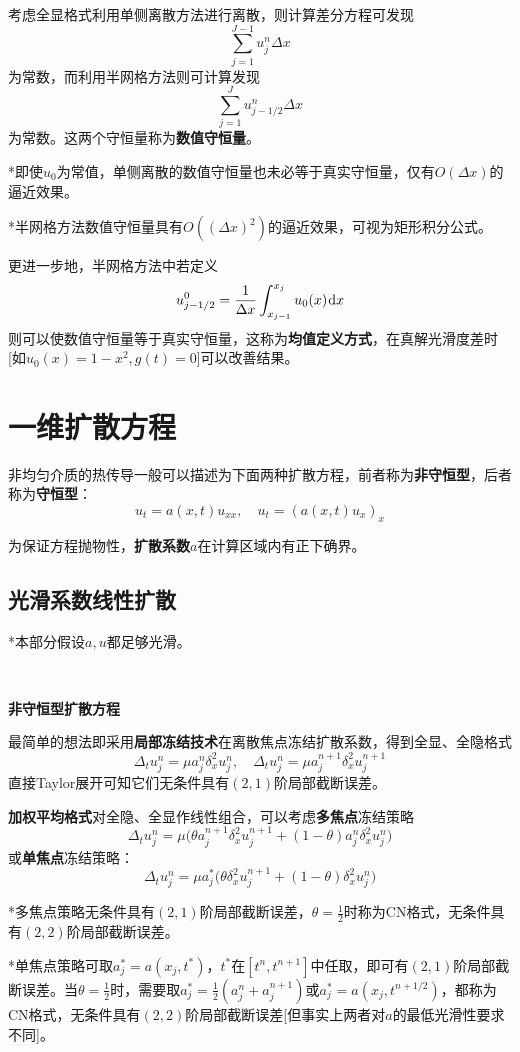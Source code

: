 \documentclass[a4paper,UTF8,fontset=windows]{ctexart}
\newcommand*{\dr}{\hspace{0.07em}\mathrm{d}}
\begin{document}
考虑全显格式利用单侧离散方法进行离散，则计算差分方程可发现
$$\sum_{j=1}^{J-1}u_j^n\Delta x$$
为常数，而利用半网格方法则可计算发现
$$\sum_{j=1}^Ju_{j-1/2}^n\Delta x$$
为常数。这两个守恒量称为\textbf{数值守恒量}。

*即使$u_0$为常值，单侧离散的数值守恒量也未必等于真实守恒量，仅有$O(\Delta x)$的逼近效果。

*半网格方法数值守恒量具有$O((\Delta x)^2)$的逼近效果，可视为矩形积分公式。

更进一步地，半网格方法中若定义
$$u_{j-1/2}^0=\frac{1}{\Delta x}\int_{x_{j-1}}^{x_j}u_0(x)\dr x$$
则可以使数值守恒量等于真实守恒量，这称为\textbf{均值定义方式}，在真解光滑度差时[如$u_0(x)=1-x^2,g(t)=0$]可以改善结果。

\section{一维扩散方程}
非均匀介质的热传导一般可以描述为下面两种扩散方程，前者称为\textbf{非守恒型}，后者称为\textbf{守恒型}：
$$u_t=a(x,t)u_{xx},\quad u_t=(a(x,t)u_x)_x$$

为保证方程抛物性，\textbf{扩散系数}$a$在计算区域内有正下确界。
\subsection{光滑系数线性扩散}
*本部分假设$a,u$都足够光滑。

\

\textbf{非守恒型扩散方程}

最简单的想法即采用\textbf{局部冻结技术}在离散焦点冻结扩散系数，得到全显、全隐格式
$$\Delta_tu_j^n=\mu a_j^n\delta_x^2u_j^n,\quad\Delta_tu_j^n=\mu a_j^{n+1}\delta_x^2u_j^{n+1}$$
直接Taylor展开可知它们无条件具有$(2,1)$阶局部截断误差。

\textbf{加权平均格式}对全隐、全显作线性组合，可以考虑\textbf{多焦点}冻结策略
$$\Delta_tu_j^n=\mu\big(\theta a_j^{n+1}\delta_x^2u_j^{n+1}+(1-\theta)a_j^n\delta_x^2u_j^n\big)$$
或\textbf{单焦点}冻结策略：
$$\Delta_tu_j^n=\mu a_j^*\big(\theta\delta_x^2u_j^{n+1}+(1-\theta)\delta_x^2u_j^n\big)$$

*多焦点策略无条件具有$(2,1)$阶局部截断误差，$\theta=\frac{1}{2}$时称为CN格式，无条件具有$(2,2)$阶局部截断误差。

*单焦点策略可取$a_j^*=a(x_j,t^*)$，$t^*$在$[t^n,t^{n+1}]$中任取，即可有$(2,1)$阶局部截断误差。当$\theta=\frac{1}{2}$时，需要取$a_j^*=\frac{1}{2}(a_j^n+a_j^{n+1})$或$a_j^*=a(x_j,t^{n+1/2})$，都称为CN格式，无条件具有$(2,2)$阶局部截断误差[但事实上两者对$a$的最低光滑性要求不同]。
\end{document}
